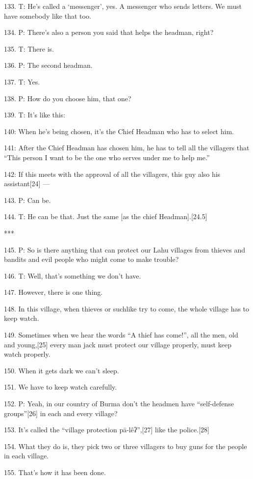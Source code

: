 {133. T: He's called a `messenger', yes. A messenger who sends letters.
We must have somebody like that too.}

{134. P: There's also a person you said that helps the headman, right?}

{135. T: There is.}

{136. P: The second headman.}

{137. T: Yes.}

{138. P: How do you choose him, that one?}

{139. T: It's like this:}

{140: When he's being chosen, it's the Chief Headman who has to select him.}

{141: After the Chief Headman has chosen him, he has to tell all the villagers
that ``This person I want to be the one who serves under me to help me.''}

{142: If this meets with the approval of all the villagers, this guy also
his assistant[24] ---}

{143. P: Can be.}

{144. T: He can be that. Just the same [as the chief Headman].[24.5]}

{***}

{145. P: So is there anything that can protect our Lahu villages from thieves
and bandits and evil people who might come to make trouble?}

{146. T: Well, that's something we don't have.}

{147. However, there is one thing.}

{148. In this village, when thieves or suchlike try to come, the whole village
has to keep watch.}

{149. Sometimes when we hear the words ``A thief has come!'', all the men,
old and young,[25]  every man jack must protect our village properly, must keep
watch properly.}

{150. When it gets dark we can't sleep.}

{151. We have to keep watch carefully.}

{152. P: Yeah, in our country of Burma don't the headmen have ``self-defense
groups''[26] in each and every village?}

{153. It's called the ``village protection pā-lêʔ'',[27] like the police.[28]}

{154. What they do is, they pick two or three villagers to buy guns for
the people in each village.}

{155. That's how it has been done.}

